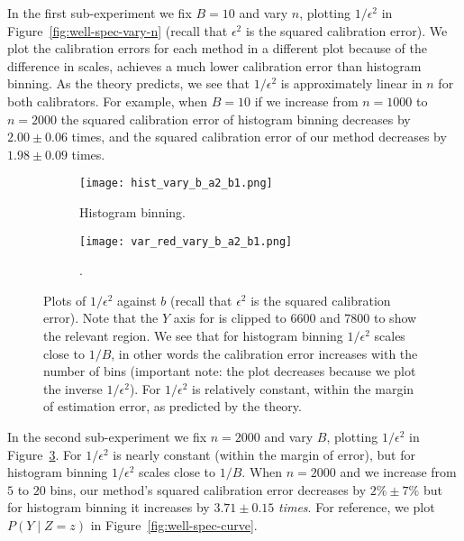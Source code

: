 In the first sub-experiment we fix $B = 10$ and vary $n$, plotting $1/\epsilon^2$ in Figure~\ref{fig:well-spec-vary-n} (recall that $\epsilon^2$ is the squared calibration error). We plot the calibration errors for each method in a different plot because of the difference in scales, \ourcal{} achieves a much lower calibration error than histogram binning. As the theory predicts, we see that $1/\epsilon^2$ is approximately linear in $n$ for both calibrators. For example, when $B=10$ if we increase from $n=1000$ to $n=2000$ the squared calibration error of histogram binning decreases by $2.00 \pm 0.06$ times, and the squared calibration error of our method decreases by $1.98 \pm 0.09$ times.

\begin{figure}
  \centering
  \centering
     \begin{subfigure}[b]{0.48\textwidth}
         \centering
         \texttt{[image: hist\_vary\_b\_a2\_b1.png]}
         \caption{Histogram binning.
         }
         \label{fig:well-spec-vary-b-hist}
     \end{subfigure}
     \hfill
     \begin{subfigure}[b]{0.48\textwidth}
         \centering
         \texttt{[image: var\_red\_vary\_b\_a2\_b1.png]}
         \caption{\Ourcal{}.
         }
         \label{fig:well-spec-vary-b-var-red}
     \end{subfigure}
  \caption{
    Plots of $1/\epsilon^2$ against $b$ (recall that $\epsilon^2$ is the squared calibration error). Note that the $Y$ axis for \ourcal{} is clipped to 6600 and 7800 to show the relevant region. We see that for histogram binning $1/\epsilon^2$ scales close to $1/B$, in other words the calibration error increases with the number of bins (important note: the plot decreases because we plot the inverse $1/\epsilon^2$). For \ourcal{} $1/\epsilon^2$ is relatively constant, within the margin of estimation error, as predicted by the theory.
}
  \label{fig:well-spec-vary-b}
\end{figure}

In the second sub-experiment we fix $n = 2000$ and vary $B$, plotting $1/\epsilon^2$ in Figure~\ref{fig:well-spec-vary-b}. For \ourcal{} $1/\epsilon^2$ is nearly constant (within the margin of error), but for histogram binning $1/\epsilon^2$ scales close to $1/B$. When $n = 2000$ and we increase from $5$ to $20$ bins, our method's squared calibration error decreases by $2\% \pm 7\%$ but for histogram binning it increases by $3.71 \pm 0.15$ \emph{times}. For reference, we plot $P(Y \mid Z = z)$ in Figure~\ref{fig:well-spec-curve}.

